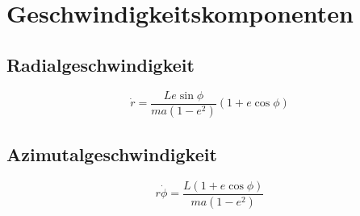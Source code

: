 \section{Geschwindigkeitskomponenten}
\subsection{Radialgeschwindigkeit}
\[
\dot{r} = \frac{L e \sin \phi}{m a(1 - e^2)} (1 + e \cos \phi)
\]

\subsection{Azimutalgeschwindigkeit}
\[
r\dot{\phi} = \frac{L(1 + e \cos \phi)}{m a(1 - e^2)}
\]